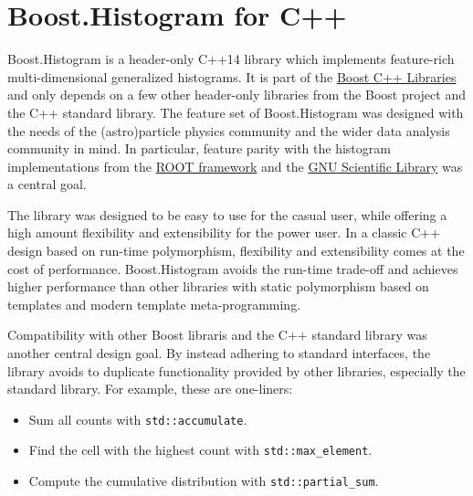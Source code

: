 \documentclass{webofc}
\begin{document}
\section{Boost.Histogram for C++}
\label{sec-bh-cpp}

%

Boost.Histogram is a header-only C++14 library which implements feature-rich multi-dimensional generalized histograms. It is part of the \href{https://www.boost.org/}{Boost C++ Libraries} and only depends on a few other header-only libraries from the Boost project and the C++ standard library. The feature set of Boost.Histogram was designed with the needs of the (astro)particle physics community and the wider data analysis community in mind. In particular, feature parity with the histogram implementations from the \href{https://root.cern.ch/}{ROOT framework} and the \href{https://www.gnu.org/software/gsl/}{GNU Scientific Library} was a central goal.

The library was designed to be easy to use for the casual user, while offering a high amount flexibility and extensibility for the power user. In a classic C++ design based on run-time polymorphism, flexibility and extensibility comes at the cost of performance. Boost.Histogram avoids the run-time trade-off and achieves higher performance than other libraries with static polymorphism based on templates and modern template meta-programming.

Compatibility with other Boost libraris and the C++ standard library was another central design goal. By instead adhering to standard interfaces, the library avoids to duplicate functionality provided by other libraries, especially the standard library. For example, these are one-liners:
\begin{itemize}
\item Sum all counts with \verb|std::accumulate|.
\item Find the cell with the highest count with \verb|std::max_element|.
\item Compute the cumulative distribution with \verb|std::partial_sum|.
\end{itemize}
\end{document}
